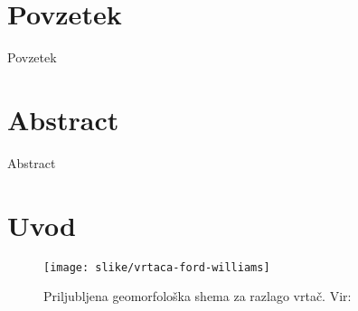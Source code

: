 \documentclass[a4paper, oneside, 12pt]{book}
\newcommand{\clearemptydoublepage}{\newpage{\pagestyle{empty}\cleardoublepage}}
\begin{document}
\clearemptydoublepage

\begin{comment}
\thispagestyle{empty}\mbox{}\vfill\null\it%
Staršema za podporo.
\rm\normalfont

\clearemptydoublepage

\thispagestyle{empty}\mbox{}{\vskip0.20\textheight}\mbox{}\hfill\begin{minipage}{0.55\textwidth}%
  Svoji dragi Alenčici.
  \normalfont\end{minipage}

  \clearemptydoublepage

  \end{comment}

  \def\thepage{}%
  \tableofcontents{}

  \clearemptydoublepage

  \chapter*{Povzetek}
  Povzetek
  \clearemptydoublepage

  \chapter*{Abstract}
  Abstract
  \clearemptydoublepage

  \mainmatter
  \setcounter{page}{1}
  \pagestyle{fancy}

  \chapter{Uvod}
  \label{ch1}

  \begin{figure}[H]
    \begin{center}
      \texttt{[image: slike/vrtaca-ford-williams]}
    \end{center}
    \caption{Priljubljena geomorfološka shema za razlago vrtač. Vir: \cite{ford2007karst}}
    \label{fig:vrtaca-ford-williams}
  \end{figure}
\end{document}
